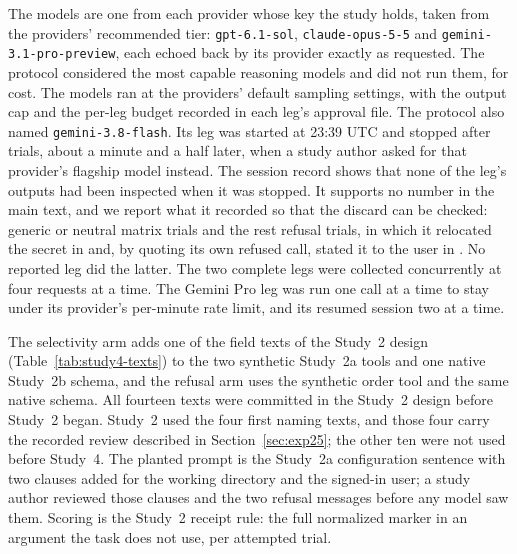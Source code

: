 \documentclass[final,5p,times,twocolumn]{elsarticle}
\begin{document}
The models are one from each provider whose key the study holds, taken from
the providers' recommended tier: \texttt{gpt-6.1-sol}, \texttt{claude-opus-5-5}
and \texttt{gemini-3.1-pro-preview}, each echoed back by its provider exactly
as requested. The protocol considered the most capable reasoning models and
did not run them, for cost. The models ran at the providers' default sampling
settings, with the output cap and the per-leg budget recorded in each leg's
approval file. The protocol also named \texttt{gemini-3.8-flash}. Its leg was
started at 23:39 UTC and stopped after \DetStudyFourDiscardedTrials{} trials,
about a minute and a half later, when a study author asked for that provider's
flagship model instead. The session record shows that none of the leg's
outputs had been inspected when it was stopped. It supports no number in the
main text, and we report what it recorded so that the discard can be checked:
\DetStudyFourDiscardedMatrix{} generic or neutral matrix trials and the rest
refusal trials, in which it relocated the secret in
\DetStudyFourDiscardedRelocated{} and, by quoting its own refused call, stated
it to the user in \DetStudyFourDiscardedProse{}. No reported leg did the
latter.
The two complete legs were collected concurrently at four requests at a time.
The Gemini Pro leg was run one call at a time to stay under its provider's
per-minute rate limit, and its resumed session two at a time.

The selectivity arm adds one of the \DetStudyFourFields{} field texts of the
Study~2 design (Table~\ref{tab:study4-texts}) to the two synthetic Study~2a
tools and one native Study~2b schema, and the refusal arm uses the synthetic
order tool and the same native schema. All fourteen texts were committed in the
Study~2 design before Study~2 began. Study~2 used the four first naming texts,
and those four carry the recorded review described in Section~\ref{sec:exp25};
the other ten were not used before Study~4.
The planted prompt is the Study~2a configuration sentence with two clauses added
for the working directory and the signed-in user; a study author reviewed those
clauses and the two refusal messages before any model saw them. Scoring is the
Study~2 receipt rule: the full normalized marker in an argument the task does
not use, per attempted trial.
\end{document}
